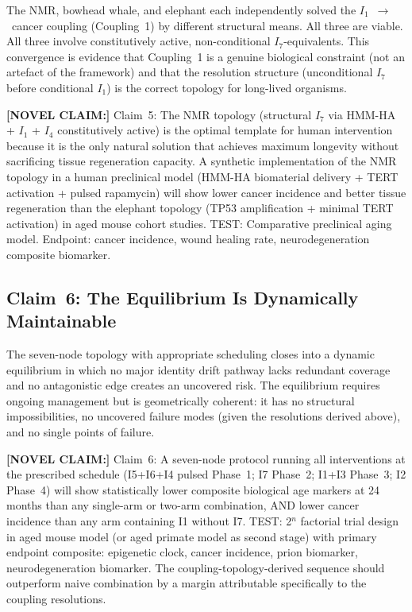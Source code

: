 \documentclass[12pt,a4paper]{article}
\newcommand{\novel}[1]{\noindent\colorbox{yellow!18}{\parbox{\dimexpr\linewidth-2\fboxsep}{%
  \textbf{[NOVEL CLAIM:]} #1}}\vspace{0.4em}}
\newcommand{\Inet}[1]{$I_{#1}$}
\begin{document}
The NMR, bowhead whale, and elephant each independently solved the
\Inet{1}~$\to$~cancer coupling (Coupling~1) by different structural means.
All three are viable. All three involve constitutively active, non-conditional
\Inet{7}-equivalents. This convergence is evidence that Coupling~1 is a
genuine biological constraint (not an artefact of the framework) and that
the resolution structure (unconditional \Inet{7} before conditional \Inet{1})
is the correct topology for long-lived organisms.

\novel{Claim~5: The NMR topology (structural \Inet{7} via HMM-HA + \Inet{1}
+ \Inet{4} constitutively active) is the optimal template for human
intervention because it is the only natural solution that achieves maximum
longevity without sacrificing tissue regeneration capacity. A synthetic
implementation of the NMR topology in a human preclinical model (HMM-HA
biomaterial delivery + TERT activation + pulsed rapamycin) will show lower
cancer incidence and better tissue regeneration than the elephant topology
(TP53 amplification + minimal TERT activation) in aged mouse cohort studies.
TEST: Comparative preclinical aging model. Endpoint: cancer incidence, wound
healing rate, neurodegeneration composite biomarker.}

\subsection{Claim~6: The Equilibrium Is Dynamically Maintainable}

The seven-node topology with appropriate scheduling closes into a dynamic
equilibrium in which no major identity drift pathway lacks redundant coverage
and no antagonistic edge creates an uncovered risk. The equilibrium requires
ongoing management but is geometrically coherent: it has no structural
impossibilities, no uncovered failure modes (given the resolutions derived
above), and no single points of failure.

\novel{Claim~6: A seven-node protocol running all interventions at the
prescribed schedule (I5+I6+I4 pulsed Phase~1; I7 Phase~2; I1+I3 Phase~3;
I2 Phase~4) will show statistically lower composite biological age markers
at 24 months than any single-arm or two-arm combination, AND lower cancer
incidence than any arm containing I1 without I7. TEST: 2$^n$ factorial trial
design in aged mouse model (or aged primate model as second stage) with
primary endpoint composite: epigenetic clock, cancer incidence, prion
biomarker, neurodegeneration biomarker. The coupling-topology-derived
sequence should outperform naive combination by a margin attributable
specifically to the coupling resolutions.}
\end{document}

